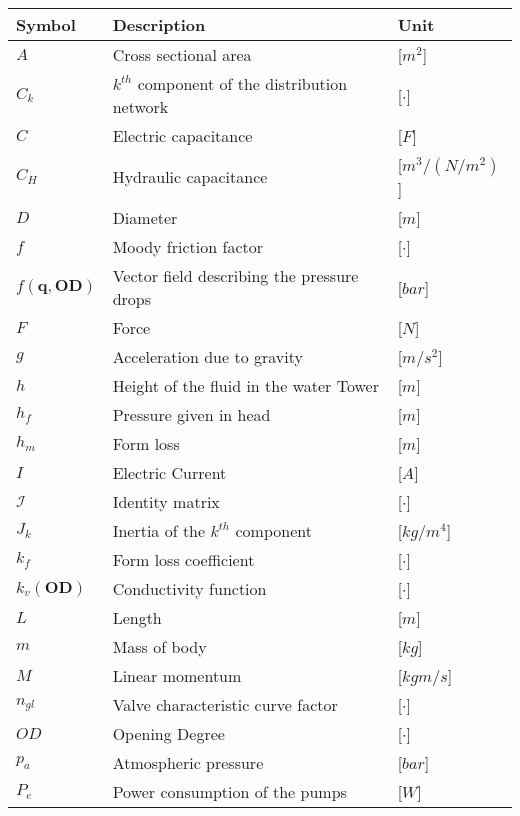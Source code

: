\begin{adjustbox}{max height=0.49\textheight}
\begin{tabular}{l l l} 
	\textbf{Symbol}		&	\textbf{Description}										& \textbf{Unit}	\\\hline
	$A$					&	Cross sectional area									    & [$m^2$]\\
	$C_k$				&	$k^{th}$ component of the distribution network     			& [$\cdot$]\\
	$C$					&	Electric capacitance								   		& [$F$]\\
	$C_H$				&	Hydraulic capacitance								   		& [$m^3/(N/m^2)$]\\
	$D$					&	Diameter									     			& [$m$]\\
	$f$					&	Moody friction factor									    & [$\cdot$]\\
	$f(\bm{q},\bm{OD})$	&	Vector field describing the pressure drops					& [$bar$]\\
	$F$					&	Force									     				& [$N$]\\
	$g$					&	Acceleration due to gravity									& [$m/s^2$]\\
	$h$					&	Height of the fluid in the water Tower						& [$m$]\\
	$h_f$				&	Pressure given in head									    & [$m$]\\
	$h_m$				&	Form loss									    			& [$m$]\\
	$I$					&	Electric Current 											& [$A$]\\
	$\bm{\mathcal{I}}$  &	Identity matrix 											& [$\cdot$]\\
	$J_k$				&	Inertia of the $k^{th}$ component							& [$kg/m^4$]\\
	$k_f$				&	Form loss coefficient								    	& [$\cdot$]\\
	$k_v(\bm{OD})$		&	Conductivity function								   	 	& [$\cdot$]\\	
	$L$					&	Length									     				& [$m$]\\
	$m$					&	Mass of body									     		& [$kg$]\\
	$M$					&	Linear momentum									     		& [$kgm/s$]\\
	$n_{gl}$			&	Valve characteristic curve factor							& [$\cdot$]\\
	$OD$				&	Opening Degree 												& [$\cdot$]\\	
	$p_a$				&	Atmospheric pressure							      		& [$bar$]\\
	$P_e$				&	Power consumption of the pumps					      		& [$W$]\\

\end{tabular}
\end{adjustbox}

